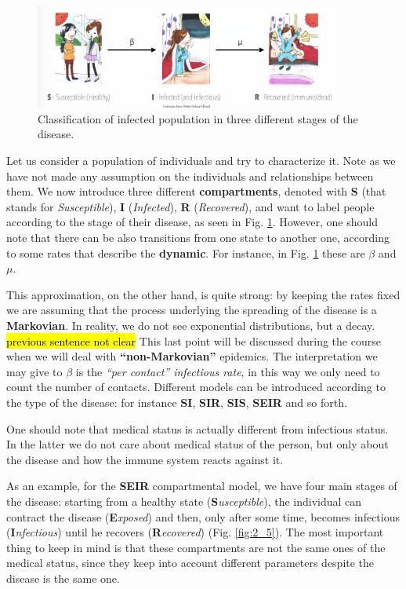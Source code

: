 \documentclass[../main/main.tex]{subfiles}
\begin{document}
\begin{figure}[!b]
\centering
\includegraphics[width=0.9\textwidth]{../lessons/image/02/1_classification.png}
\caption{\label{fig:1_classification} Classification of infected population in three different stages of the disease.}
\end{figure}

Let us consider a population of individuals and try to characterize it. Note as we have not made any assumption on the individuals and relationships between them. We now introduce three different \textbf{compartments}, denoted with \textbf{S} (that stands for \textit{Susceptible}), \textbf{I} (\textit{Infected}), \textbf{R} (\textit{Recovered}), and want to label people according to the stage of their disease, as seen in Fig. \ref{fig:1_classification}. However, one should note that there can be also transitions from one state to another one, according to some rates that describe the \textbf{dynamic}. For instance, in Fig. \ref{fig:1_classification} these are $\beta$ and $\mu$.

This approximation, on the other hand, is quite strong: by keeping the rates fixed we are assuming that the process underlying the spreading of the disease is a \textbf{Markovian}. In reality, we do not see exponential distributions, but a decay. \hl{previous sentence not clear} This last point will be discussed during the course when we will deal with \textbf{“non-Markovian”} epidemics. The interpretation we may give to $\beta$ is the \textit{“per contact” infectious rate}, in this way we only need to count the number of contacts.
Different models can be introduced according to the type of the disease: for instance \textbf{SI}, \textbf{SIR}, \textbf{SIS}, \textbf{SEIR} and so forth.

\medskip

One should note that medical status is actually different from infectious status. In the latter we do not care about medical status of the person, but only about the disease and how the immune system reacts against it.

As an example, for the \textbf{SEIR} compartmental model, we have four main stages of the disease: starting from a healthy state (\textbf{S}\textit{usceptible}), the individual can contract the disease (\textbf{E}\textit{xposed}) and then, only after some time, becomes infectious (\textbf{I}\textit{nfectious}) until he recovers (\textbf{R}\textit{ecovered}) (Fig. \ref{fig:2_5}). The most important thing to keep in mind is that these compartments are not the same ones of the medical status, since they keep into account different parameters despite the disease is the same one.
\end{document}
